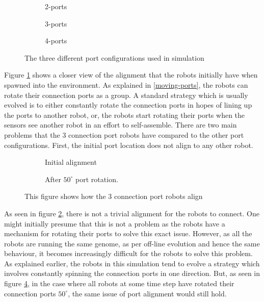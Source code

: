 \begin{figure}[H]
	\centering
	\begin{subfigure}[b]{0.31\textwidth}
		\centering
		\caption{2-ports}
	\end{subfigure}
	\begin{subfigure}[b]{0.31\textwidth}
		\centering
		\caption{3-ports}
	\end{subfigure}
	\begin{subfigure}[b]{0.31\textwidth}
		\centering
		\caption{4-ports}
	\end{subfigure}
	\caption{The three different port configurations used in simulation}
	\label{fig:robot-port-configuration}
\end{figure}

Figure \ref{fig:robot-port-configuration} shows a closer view of the alignment that the robots initially have when spawned into the environment.
As explained in \ref{moving-ports}, the robots can rotate their connection ports as a group.
A standard strategy which is usually evolved is to either constantly rotate the connection ports in hopes of lining up the ports to another robot, or, the robots start rotating their ports when the sensors see another robot in an effort to self-assemble.
There are two main problems that the 3 connection port robots have compared to the other port configurations.
First, the initial port location does not align to any other robot.


\begin{figure}[H]
	\begin{subfigure}[t]{0.49\textwidth}
		\centering
		\caption{Initial alignment}
		\label{3-port-guided-allignment}
	\end{subfigure}
	\begin{subfigure}[t]{0.49\textwidth}
		\centering
		\caption{After $50^{\circ}$ port rotation.}
		\label{3-port-guided-allignment-offset}
	\end{subfigure}
	\caption{This figure shows how the 3 connection port robots align}
\end{figure}


As seen in figure \ref{3-port-guided-allignment}, there is not a trivial alignment for the robots to connect.
One might initially presume that this is not a problem as the robots have a mechanism for rotating their ports to solve this exact issue.
However, as all the robots are running the same genome, as per off-line evolution and hence the same behaviour, it becomes increasingly difficult for the robots to solve this problem.
As explained earlier, the robots in this simulation tend to evolve a strategy which involves constantly spinning the connection ports in one direction.
But, as seen in figure \ref{3-port-guided-allignment-offset}, in the case where all robots at some time step have rotated their connection ports $50^{\circ}$, the same issue of port alignment would still hold.

